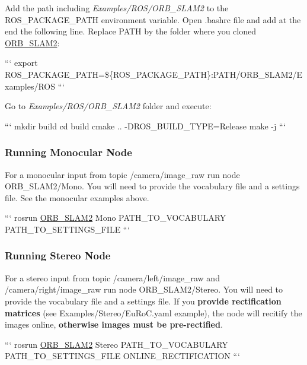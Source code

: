 \begin{DoxyEnumerate}
\item Add the path including {\itshape Examples/\-R\-O\-S/\-O\-R\-B\-\_\-\-S\-L\-A\-M2} to the R\-O\-S\-\_\-\-P\-A\-C\-K\-A\-G\-E\-\_\-\-P\-A\-T\-H environment variable. Open .bashrc file and add at the end the following line. Replace P\-A\-T\-H by the folder where you cloned \hyperlink{namespaceORB__SLAM2}{O\-R\-B\-\_\-\-S\-L\-A\-M2}\-:

``` export R\-O\-S\-\_\-\-P\-A\-C\-K\-A\-G\-E\-\_\-\-P\-A\-T\-H=\$\{R\-O\-S\-\_\-\-P\-A\-C\-K\-A\-G\-E\-\_\-\-P\-A\-T\-H\}\-:P\-A\-T\-H/\-O\-R\-B\-\_\-\-S\-L\-A\-M2/\-Examples/\-R\-O\-S ```
\item Go to {\itshape Examples/\-R\-O\-S/\-O\-R\-B\-\_\-\-S\-L\-A\-M2} folder and execute\-:

``` mkdir build cd build cmake .. -\/\-D\-R\-O\-S\-\_\-\-B\-U\-I\-L\-D\-\_\-\-T\-Y\-P\-E=Release make -\/j ```
\end{DoxyEnumerate}

\subsubsection*{Running Monocular Node}

For a monocular input from topic {\ttfamily /camera/image\-\_\-raw} run node O\-R\-B\-\_\-\-S\-L\-A\-M2/\-Mono. You will need to provide the vocabulary file and a settings file. See the monocular examples above.

``` rosrun \hyperlink{namespaceORB__SLAM2}{O\-R\-B\-\_\-\-S\-L\-A\-M2} Mono P\-A\-T\-H\-\_\-\-T\-O\-\_\-\-V\-O\-C\-A\-B\-U\-L\-A\-R\-Y P\-A\-T\-H\-\_\-\-T\-O\-\_\-\-S\-E\-T\-T\-I\-N\-G\-S\-\_\-\-F\-I\-L\-E ```

\subsubsection*{Running Stereo Node}

For a stereo input from topic {\ttfamily /camera/left/image\-\_\-raw} and {\ttfamily /camera/right/image\-\_\-raw} run node O\-R\-B\-\_\-\-S\-L\-A\-M2/\-Stereo. You will need to provide the vocabulary file and a settings file. If you {\bfseries provide rectification matrices} (see Examples/\-Stereo/\-Eu\-Ro\-C.\-yaml example), the node will recitify the images online, {\bfseries otherwise images must be pre-\/rectified}.

``` rosrun \hyperlink{namespaceORB__SLAM2}{O\-R\-B\-\_\-\-S\-L\-A\-M2} Stereo P\-A\-T\-H\-\_\-\-T\-O\-\_\-\-V\-O\-C\-A\-B\-U\-L\-A\-R\-Y P\-A\-T\-H\-\_\-\-T\-O\-\_\-\-S\-E\-T\-T\-I\-N\-G\-S\-\_\-\-F\-I\-L\-E O\-N\-L\-I\-N\-E\-\_\-\-R\-E\-C\-T\-I\-F\-I\-C\-A\-T\-I\-O\-N ```

